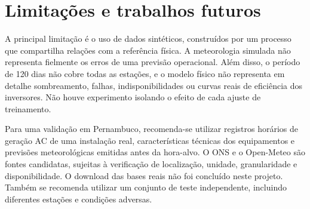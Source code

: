 \documentclass[12pt]{article}
\begin{document}
\maketitle
% 






\section{Limitações e trabalhos futuros}
A principal limitação é o uso de dados sintéticos, construídos por um processo que compartilha relações com a referência física. A meteorologia simulada não representa fielmente os erros de uma previsão operacional. Além disso, o período de 120 dias não cobre todas as estações, e o modelo físico não representa em detalhe sombreamento, falhas, indisponibilidades ou curvas reais de eficiência dos inversores. Não houve experimento isolando o efeito de cada ajuste de treinamento.

Para uma validação em Pernambuco, recomenda-se utilizar registros horários de geração AC de uma instalação real, características técnicas dos equipamentos e previsões meteorológicas emitidas antes da hora-alvo. O ONS \cite{ons} e o Open-Meteo \cite{meteo} são fontes candidatas, sujeitas à verificação de localização, unidade, granularidade e disponibilidade. O download das bases reais não foi concluído neste projeto. Também se recomenda utilizar um conjunto de teste independente, incluindo diferentes estações e condições adversas.




\end{document}
